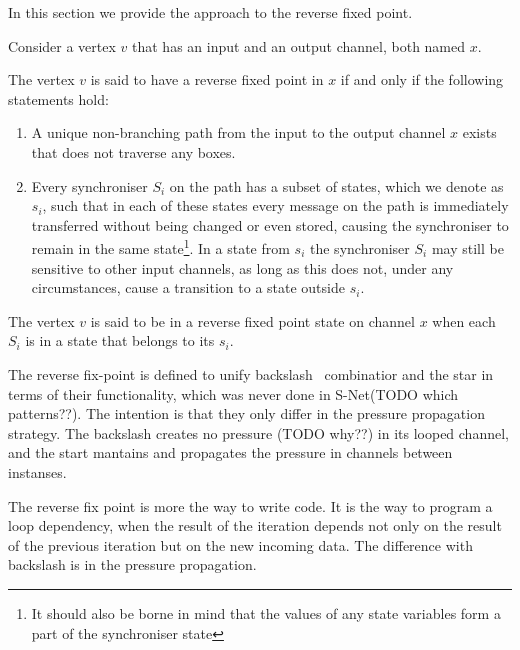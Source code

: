 In this section we provide the approach to the reverse fixed point.

Consider a vertex $v$ that has an input and an output channel, both named $x$.

\begin{definition} The vertex $v$ is said to have a reverse fixed point in $x$ if and only if the following statements hold:

\begin{enumerate}
\item A unique non-branching path from the input to the output channel $x$ exists that does not traverse any boxes.

\item Every synchroniser $S_i$ on the path has a subset of states, which we denote as $s_i$, such that in each of these states every message on the path is immediately transferred without being changed or even stored, causing the synchroniser to remain in the same state\footnote{It should also be borne in mind that the values of any state variables form a part of the synchroniser state}. In a state from $s_i$ the synchroniser $S_i$ may still be sensitive to other input channels, as long as this does not, under any circumstances, cause a transition to a state outside $s_i$.
\end{enumerate}
\end{definition}

The vertex $v$ is said to be in a reverse fixed point state on channel $x$ when each $S_i$ is in a state that belongs to its $s_i$.

The reverse fix-point is defined to unify backslash \ combinatior and the star in terms of their functionality, which was never done in S-Net(TODO which patterns??). The intention is that they only differ in the pressure propagation strategy. The backslash creates no pressure (TODO why??) in its looped channel, and the start mantains and propagates the pressure in channels between instanses.

%
%
%
%

The reverse fix point is more the way to write code. It is the way to program a loop dependency, when the result of the iteration depends not only on the result of the previous iteration but on the new incoming data. The difference with backslash is in the pressure propagation.

